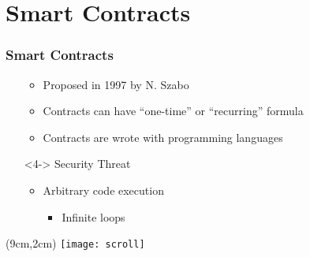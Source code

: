 \section{Smart Contracts}
\begin{frame}
  \frametitle{Smart Contracts}

  \begin{itemize}
   \item[]
    \begin{itemize}
      \item<1-> Proposed in 1997 by N. Szabo
      \item<2-> Contracts can have ``one-time'' or ``recurring'' formula
      \item<3-> Contracts are wrote with programming languages
    \end{itemize}

   \item[]<4-> Security Threat
    \begin{itemize}
     \item Arbitrary code execution
     \begin{itemize}
      \item Infinite loops
     \end{itemize}
    \end{itemize}
  \end{itemize}


  \begin{textblock*}{5cm}(9cm,2cm)
    \texttt{[image: scroll]}
  \end{textblock*}

\end{frame}

